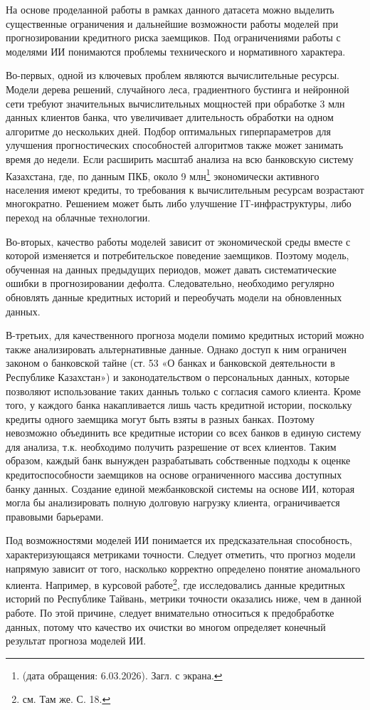 На основе проделанной работы в рамках данного датасета можно выделить существенные ограничения и дальнейшие возможности работы моделей при прогнозировании кредитного риска заемщиков. Под ограничениями работы с моделями ИИ понимаются проблемы технического и нормативного характера. 

Во-первых, одной из ключевых проблем являются вычислительные ресурсы. Модели дерева решений, случайного леса, градиентного бустинга и нейронной сети требуют значительных вычислительных мощностей при обработке 3 млн данных клиентов банка, что увеличивает длительность обработки на одном алгоритме до нескольких дней. Подбор оптимальных гиперпараметров для улучшения прогностических способностей алгоритмов также может занимать время до недели. Если расширить масштаб анализа на всю банковскую систему Казахстана, где, по данным ПКБ, около 9 млн\footnote{\cite{24kz} (дата обращения: 6.03.2026). Загл. с экрана.} экономически активного населения имеют кредиты, то требования к вычислительным ресурсам возрастают многократно. Решением может быть либо улучшение IT-инфраструктуры, либо переход на облачные технологии.

Во-вторых, качество работы моделей зависит от экономической среды вместе с которой изменяется и потребительское поведение заемщиков. Поэтому модель, обученная на данных предыдущих периодов, может давать систематические ошибки в прогнозировании дефолта. Следовательно, необходимо регулярно обновлять данные кредитных историй и переобучать модели на обновленных данных.

В-третьих, для качественного прогноза модели помимо кредитных историй можно также анализировать альтернативные данные. Однако доступ к ним ограничен законом о банковской тайне (ст. 53 «О банках и банковской деятельности в Республике Казахстан») и законодательством о персональных данных, которые позволяют использование таких данныъ только с согласия самого клиента. Кроме того, у каждого банка накапливается лишь часть кредитной истории, поскольку кредиты одного заемщика могут быть взяты в разных банках. Поэтому невозможно объединить все кредитные истории со всех банков в единую систему для анализа, т.к. необходимо получить разрешение от всех клиентов. Таким образом, каждый банк вынужден разрабатывать собственные подходы к оценке кредитоспособности заемщиков на основе ограниченного массива доступных банку данных. Создание единой межбанковской системы на основе ИИ, которая могла бы анализировать полную долговую нагрузку клиента, ограничивается правовыми барьерами.

Под возможностями моделей ИИ понимается их предсказательная способность, характеризующаяся метриками точности. Следует отметить, что прогноз модели напрямую зависит от того, насколько корректно определено понятие аномального клиента. Например, в курсовой работе\footnote{см. Там же. С. 18.}, где исследовались данные кредитных историй по Республике Тайвань, метрики точности оказались ниже, чем в данной работе. По этой причине, следует внимательно относиться к предобработке данных, потому что качество их очистки во многом определяет конечный результат прогноза моделей ИИ.